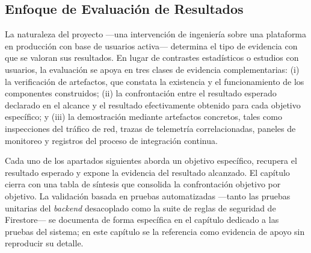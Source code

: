 \subsection{Enfoque de Evaluación de Resultados}\label{subsec:enfoque-resultados}

La naturaleza del proyecto —una intervención de ingeniería sobre una plataforma en producción con base de usuarios activa— determina el tipo de evidencia con que se valoran sus resultados. En lugar de contrastes estadísticos o estudios con usuarios, la evaluación se apoya en tres clases de evidencia complementarias: (i) la verificación de artefactos, que constata la existencia y el funcionamiento de los componentes construidos; (ii) la confrontación entre el resultado esperado declarado en el alcance y el resultado efectivamente obtenido para cada objetivo específico; y (iii) la demostración mediante artefactos concretos, tales como inspecciones del tráfico de red, trazas de telemetría correlacionadas, paneles de monitoreo y registros del proceso de integración continua.

Cada uno de los apartados siguientes aborda un objetivo específico, recupera el resultado esperado y expone la evidencia del resultado alcanzado. El capítulo cierra con una tabla de síntesis que consolida la confrontación objetivo por objetivo. La validación basada en pruebas automatizadas —tanto las pruebas unitarias del \textit{backend} desacoplado como la suite de reglas de seguridad de Firestore— se documenta de forma específica en el capítulo dedicado a las pruebas del sistema; en este capítulo se la referencia como evidencia de apoyo sin reproducir su detalle.
